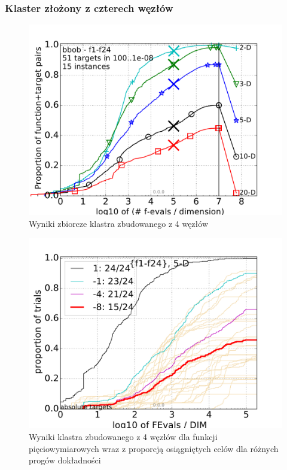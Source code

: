 \documentclass[12pt, twoside, openany, abstract=on]{report}
\theoremstyle{definition}
\begin{document}
\subsubsection{Klaster złożony z czterech węzłów}

\begin{figure}[H]
    \includegraphics[scale=1]{charts/4nodes.pdf} 
 \caption{Wyniki zbiorcze klastra zbudowanego z 4 węzłów}
\end{figure}

\begin{figure}[H]
    \includegraphics[scale=1]{charts/4nodes_5D.pdf} \par
 \caption{Wyniki klastra zbudowanego z 4 węzłów dla funkcji pięciowymiarowych wraz z proporcją osiągniętych celów dla różnych progów dokładności}
\end{figure}
\end{document}
